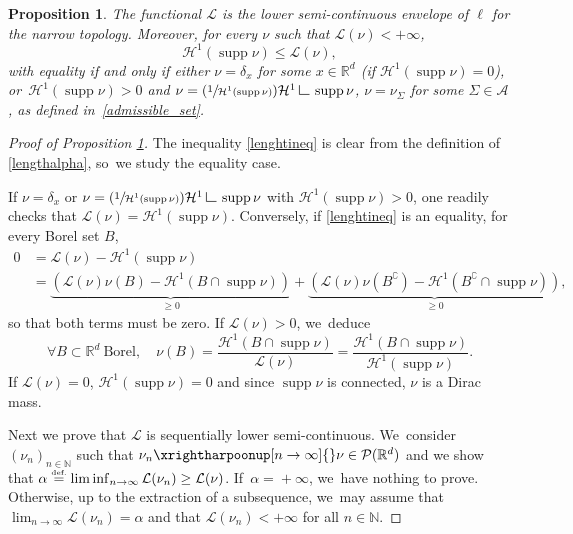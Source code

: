 \documentclass[10pt]{amsart}
\newcommand{\Psfrac}[2]{(\sfrac{#1}{#2})}
\newtheorem{proposition}[theorem]{Proposition}
\theoremstyle{definition}
\newcommand{\eqdef}{\ensuremath{\stackrel{\mbox{\upshape\tiny def.}}{=}}}
\newcommand\LM[1]{\hbox{\vrule width.5pt \vbox to#1pt{\vfill \hrule width#1pt height.5pt}}}
\newcommand\LL{{\mathchoice {\>\LM7\>}{\>\LM7\>}{\,\LM5\,}{\,\LM{3.35}\,}}}
\newcommand{\mres}{\LL}
\newcommand\cH{\mathcal{H}}
\newcommand{\RR}{\mathbb{R}}
\DeclareMathOperator{\supp}{supp}
\begin{document}
\begin{proposition}
\label{proposition.length_functional_is_lsc}
The functional $\mathcal{L}$ is the lower semi-continuous envelope of $\ell$ for the narrow topology. Moreover, for every $\nu$ such that $\mathcal{L}(\nu)<+\infty$,
\begin{equation}\label{lenghtineq}
\cH^1(\supp \nu)\leq \mathcal{L}(\nu),
\end{equation}
with equality if and only if either $\nu=\delta_x$ for some $x \in \RR^d$ (if $\cH^1(\supp\nu)=0$), or~$\cH^1(\supp\nu)>0$ and $ \nu=\Psfrac{1}{\cH^1(\supp \nu)}\cH^1\mres \supp \nu$, \ie $\nu = \nu_\Sigma$ for some $\Sigma \in \mathcal{A}$, as defined in~\eqref{admissible_set}.
\end{proposition}

\begin{proof}[Proof of Proposition \ref{proposition.length_functional_is_lsc}]
The inequality \eqref{lenghtineq} is clear from the definition of \eqref{lengthalpha}, so~we study the equality case.

If $\nu=\delta_x$ or $\nu=\Psfrac{1}{\cH^1(\supp \nu)}\cH^1\mres \supp \nu$ with $\cH^1(\supp\nu)>0$, one readily checks that $\mathcal{L}(\nu)=\cH^1(\supp \nu)$.
Conversely, if \eqref{lenghtineq} is an equality, for every Borel set $B$,
\begin{align*}
0 &= \mathcal{L}(\nu)-\cH^1(\supp\nu) \\
&= \underbrace{\left(\mathcal{L}(\nu)\nu(B)-\cH^1(B\cap \supp\nu)\right)}_{\geq 0}+ \underbrace{\left(\mathcal{L}(\nu)\nu(B^\complement)-\cH^1(B^\complement\cap \supp\nu)\right)}_{\geq 0},
\end{align*}
so that both terms must be zero. If $\mathcal{L}(\nu)>0$, we~deduce
\begin{equation*}
\forall B\subset \RR^d\ \mbox{Borel},\quad \nu(B) = \frac{\cH^1(B\cap \supp\nu)}{\mathcal{L}(\nu)}= \frac{\cH^1(B\cap \supp\nu)}{\cH^1(\supp \nu)}.
\end{equation*}
If $\mathcal{L}(\nu)=0$, $\cH^1(\supp\nu)=0$ and since $\supp \nu$ is connected, $\nu$ is a Dirac mass.

Next we prove that $\mathcal{L}$ is sequentially lower semi-continuous. We~consider $(\nu_{n})_{n\in \mathbb{N}}$ such that $\nu_n \xrightharpoonup[n \to \infty]{} \nu \in \mathcal{P}(\RR^d)$ and we show that $\alpha \eqdef \liminf_{n \to \infty} \mathcal{L}(\nu_n) \geq \mathcal{L}(\nu)$. If~$\alpha\!=\!+\infty$, we~have nothing to prove. Otherwise, up to the extraction of a subsequence, we~may assume that $\lim_{n \to \infty} \mathcal{L}(\nu_n)=\alpha$ and that $\mathcal{L}(\nu_n)<+\infty$ for all $n \in \mathbb{N}$.


\end{proof}
\end{document}
